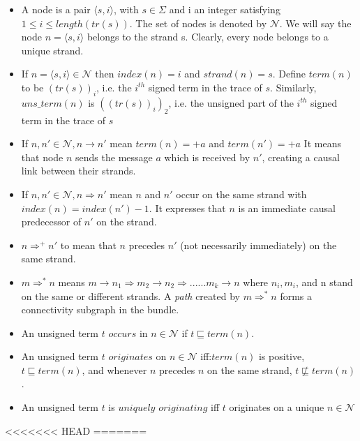 	\begin{itemize}
		\item A node is a pair $\langle s,i\rangle$, with $s \in \Sigma$ and i an integer satisfying $1\leq i \leq length(tr(s))$. The set of nodes is denoted by $\mathcal{N}$. We will say the node $n= \langle s,i\rangle$ belongs to the strand s. Clearly, every node belongs to a unique strand. 

		\item If $n= \langle s,i \rangle \in \mathcal{N}$ then $index(n) = i$ and $strand(n)=s$. Define $term(n)$ to be $(tr(s))_i$, i.e. the $i^{th}$ signed term in the trace of $s$. Similarly, $uns\_term(n)$ is $((tr(s))_i)_2$, i.e. the unsigned part of the $i^{th}$ signed term in the trace of $s$

		\item If $n,n' \in \mathcal{N}, n \rightarrow n'$ mean $term(n) = +a$ and $term(n') = +a$ It means that node $n$ sends the message $a$ which is received by $n'$, creating a causal link between their strands.

		\item If $n,n' \in \mathcal{N}, n \Rightarrow n'$ mean $n$ and $n'$ occur on the same strand with $index(n)=index(n') -1 $. It expresses that $n$ is an immediate causal predecessor of $n'$ on the strand. 
		
		\item $n \Rightarrow^+ n'$ to mean that $n$ precedes $n'$ (not necessarily immediately) on the same strand.
			
		\item $m \Rightarrow^* n$ means $m \rightarrow n_1 \Rightarrow m_2 \rightarrow n_2 \Rightarrow ......m_k \rightarrow n$ where $n_i, m_i$, and n stand on the same or different strands. A \emph{path} created by $m \Rightarrow^* n$ forms a connectivity subgraph in the bundle. 

		\item An unsigned term $t$ $occurs$ in $n \in \mathcal{N}$ if $t \sqsubseteq term(n)$.

		\item An unsigned term $t$ $originates$ on $n \in \mathcal{N}$ iff:$term(n)$ is positive, $t \sqsubseteq term(n)$, and whenever $n$ precedes $n$ on the same strand, $t \not\sqsubseteq term(n)$.

		\item An unsigned term $t$ is $\textit{uniquely originating}$ iff $t$ originates on a unique $n \in \mathcal{N}$ 

	\end{itemize}
<<<<<<< HEAD
=======

